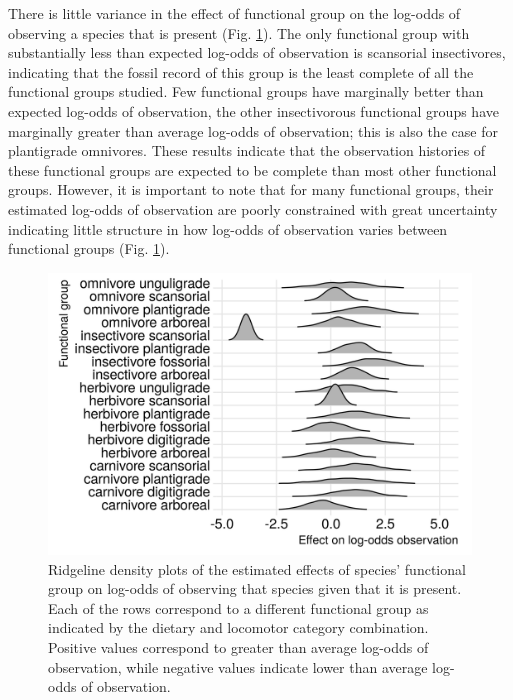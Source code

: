 \documentclass[12pt,letterpaper]{article}
\begin{document}
There is little variance in the effect of functional group on the log-odds of observing a species that is present (Fig. \ref{fig:fg_observe}). The only functional group with substantially less than expected log-odds of observation is scansorial insectivores, indicating that the fossil record of this group is the least complete of all the functional groups studied. Few functional groups have marginally better than expected log-odds of observation, the other insectivorous functional groups have marginally greater than average log-odds of observation; this is also the case for plantigrade omnivores. These results indicate that the observation histories of these functional groups are expected to be complete than most other functional groups. However, it is important to note that for many functional groups, their estimated log-odds of observation are poorly constrained with great uncertainty indicating little structure in how log-odds of observation varies between functional groups (Fig. \ref{fig:fg_observe}).
\begin{figure}[ht]
  \centering
  \includegraphics[width=\textwidth,height=0.4\textheight,keepaspectratio=true]{figure/ecotype_observation}
  \caption{Ridgeline density plots of the estimated effects of species' functional group on log-odds of observing that species given that it is present. Each of the rows correspond to a different functional group as indicated by the dietary and locomotor category combination. Positive values correspond to greater than average log-odds of observation, while negative values indicate lower than average log-odds of observation.}
  \label{fig:fg_observe}
\end{figure}
\end{document}
